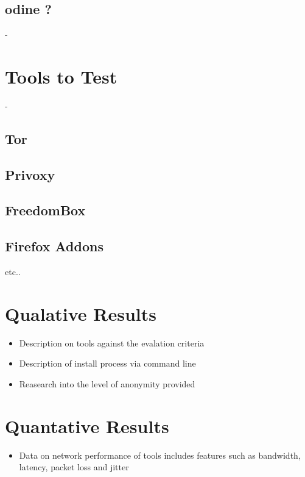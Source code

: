 \documentclass[12pt,a4paper,oneside]{article}
\begin{document}
\subsection{odine ?}
- 
\section{Tools to Test} 
- 
\subsection{Tor}
\subsection{Privoxy}
\subsection{FreedomBox}
\subsection{Firefox Addons}

etc..

\section{Qualative Results}
\begin{itemize}
\item Description on tools against the evalation criteria 
\item Description of install process via command line
\item Reasearch into the level of anonymity provided
\end{itemize}


\section{Quantative Results}
\begin{itemize}
\item Data on network performance of tools includes features such as bandwidth, latency, packet loss and jitter
\end{itemize}
\end{document}
